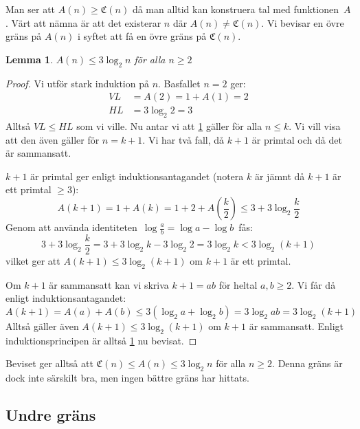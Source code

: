 \documentclass[a4paper,titlepage]{article}
\newcommand{\C}[1]{\mathfrak C \left( #1 \right)}
\newtheorem{lemma}{Lemma}
\theoremstyle{definition}
\begin{document}
    Man ser att $A(n)\ge\C{n}$ då man alltid kan konstruera tal med
    funktionen~$A$. Värt att nämna är att det existerar $n$ där $A(n)\neq\C{n}$.
    Vi bevisar en övre gräns på $A(n)$ i syftet att få en övre gräns på $\C{n}$.

    \begin{lemma}
        $A(n)\le 3 \log_2{n}$ \quad för alla $n\ge2$
        \label{lemma:adrian}
    \end{lemma}
    \begin{proof}
        Vi utför stark induktion på $n$. Basfallet $n=2$ ger:
        \begin{align*}
            VL &=A(2)=1+A(1)=2\\
            HL &= 3 \log_2{2}=3 
        \end{align*}
        Alltså $VL \le HL$ som vi ville.
        Nu antar vi att \cref{lemma:adrian} gäller för alla $n \le k$. Vi vill
        visa att den även gäller för $n=k+1$.
        Vi har två fall, då $k+1$ är primtal och då det är sammansatt.

        $k+1$ är primtal ger enligt induktionsantagandet (notera $k$ är jämnt
        då $k+1$ är ett primtal $\ge3$):
        $$A(k+1) = 1 + A(k) = 1+2+A\left(\frac{k}{2}\right) \le 3 + 3 \log_2\frac{k}{2}$$
        Genom att använda identiteten \,$\log \frac{a}{b}=\log a -\log b$\, fås:
        $$ 3 + 3 \log_2\frac{k}{2} = 3 + 3\log_2 k - 3\log_2 2 = 3\log_2 k < 3\log_2 (k+1)$$
        vilket ger att $A(k+1)\le 3\log_2 (k+1)$ om $k+1$ är ett primtal.

        Om $k+1$ är sammansatt kan vi skriva $k+1 = ab$ för heltal $a,b \ge 2$.
        Vi får då enligt induktionsantagandet:
        $$A(k+1) = A(a)+A(b) \le 3(\log_2a + \log_2b) = 3\log_2 ab = 3\log_2
        (k+1)$$ Alltså gäller även $A(k+1) \le 3\log_2 (k+1)$ om $k+1$ är
        sammansatt. Enligt induktionsprincipen är alltså \cref{lemma:adrian} nu
        bevisat.
    \end{proof}

    Beviset ger alltså att $\C{n}\le A(n)\le 3\log_2 n$ för alla $n\ge2$. Denna
    gräns är dock inte särskilt bra, men ingen bättre gräns har hittats.

    \subsection{Undre gräns}
    \label{undregrans}
\end{document}
